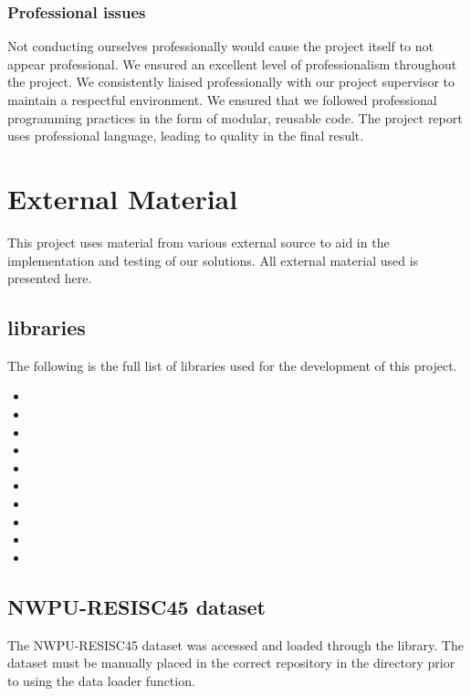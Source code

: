 \begin{appendices}
\subsection{Professional issues}
Not conducting ourselves professionally would cause the project itself to not appear professional. We ensured an excellent level of professionalism throughout the project. We consistently liaised professionally with our project supervisor to maintain a respectful environment. We ensured that we followed professional programming practices in the form of modular, reusable code. The project report uses professional language, leading to quality in the final result.

\chapter{External Material}\label{app:external_material}
This project uses material from various external source to aid in the implementation and testing of our solutions. All external material used is presented here.

\section{ libraries}
The following is the full list of  libraries used for the development of this project.
\begin{itemize}
    \item {}
    \item {}
    \item {}
    \item {}
    \item {}
    \item {}
    \item {}
    \item {}
    \item {}
    \item {}
\end{itemize}

\section{NWPU-RESISC45 dataset}
The NWPU-RESISC45 dataset was accessed and loaded through the  library. The dataset must be manually placed in the correct repository in the  directory prior to using the data loader function. 


\end{appendices}
